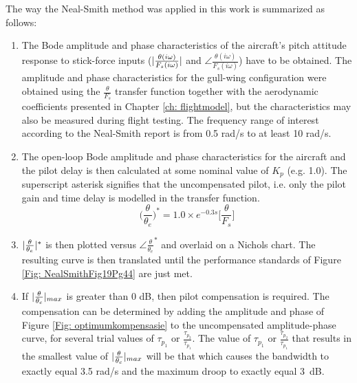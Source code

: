 \documentclass{report}
\begin{document}
The way the Neal-Smith method was applied in this work is summarized as follows:


\begin{enumerate}
	\item{The Bode amplitude and phase characteristics of the aircraft's pitch attitude response to stick-force inputs ($\arrowvert \frac{\theta(i \omega)}{F_s (i \omega)} \arrowvert$ and $\angle \frac{\theta(i \omega)}{F_s (i \omega)}$) have to be obtained.  The amplitude and phase characteristics for the gull-wing configuration were obtained using the $\frac{\theta}{F_s}$ transfer function together with the aerodynamic coefficients presented in Chapter \ref{ch: flightmodel}, but the characteristics may also be measured during flight testing.  The frequency range of interest according to the Neal-Smith report is from 0.5 rad/s to at least 10 rad/s.}
	\item{The open-loop Bode amplitude and phase characteristics for the aircraft and the pilot delay is then calculated at some nominal value of $K_p$ (e.g. 1.0).  The superscript asterisk signifies that the uncompensated pilot, i.e. only the pilot gain and time delay is modelled in the transfer function.
	\begin{equation}
	\Big( \frac{\theta}{\theta_e} \Big)^* = 1.0 \times e^{-0.3s} \Big[ \frac{\theta}{F_s} \Big]
	\end{equation}}
	\item{$\arrowvert \frac{\theta}{\theta_e} \arrowvert ^*$ is then plotted versus $\angle \frac{\theta}{\theta_e}^*$ and overlaid on a Nichols chart.  The resulting curve is then translated until the performance standards of Figure \ref{Fig: NealSmithFig19Pg44} are just met.}
	\item{If $\arrowvert \frac{\theta}{\theta_c} \arrowvert _{max}$ is greater than 0 dB, then pilot compensation is required.  The compensation can be determined by adding the amplitude and phase of Figure \ref{Fig: optimumkompensasie} to the uncompensated amplitude-phase curve, for several trial values of $\tau_{p_1}$ or $\frac{\tau_{p_2}}{\tau_{p_1}}$.  The value of $\tau_{p_1}$ or $\frac{\tau_{p_2}}{\tau_{p_1}}$ that results in the smallest value of $\arrowvert \frac{\theta}{\theta_c} \arrowvert _{max}$ will be that which causes the bandwidth to exactly equal 3.5 rad/s and the maximum droop to exactly equal \mbox{3 dB.}}

\end{enumerate}
\end{document}
